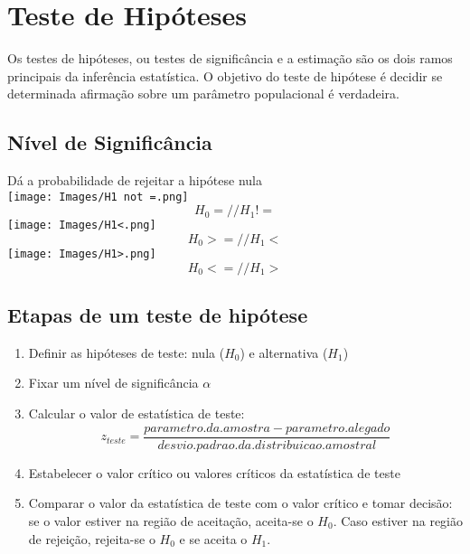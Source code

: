 \documentclass[ ]{article}
\begin{document}
\section{Teste de Hipóteses}
	Os testes de hipóteses, ou testes de significância e a estimação são os dois ramos principais da inferência estatística. O objetivo do teste de hipótese é decidir se determinada afirmação sobre um parâmetro populacional é verdadeira.
\subsection{Nível de Significância}
	 Dá a probabilidade de rejeitar a hipótese nula\\
	 
	 \texttt{[image: Images/H1 not =.png]}
	 $$H_0 = // H_1 !=$$
	  \texttt{[image: Images/H1<.png]}
	  $$H_0>= // H_1 <$$
	   \texttt{[image: Images/H1>.png]}
	   $$H_0<= // H_1 >$$
\subsection{Etapas de um teste de hipótese}
	\begin{enumerate}
		\item Definir as hipóteses de teste: nula ($H_0$) e alternativa ($H_1$)
		\item Fixar um nível de significância $\alpha$
		\item Calcular o valor de estatística de teste:
		$$z_{teste}=\dfrac{parametro.da.amostra - parametro.alegado}{desvio.padrao.da.distribuicao.amostral}$$
		\item Estabelecer o valor crítico ou valores críticos da estatística de teste
		\item Comparar o valor da estatística de teste  com o valor crítico e tomar decisão: se o valor estiver na região de aceitação, aceita-se o $H_0$. Caso estiver na região de rejeição, rejeita-se o $H_0$ e se aceita o $H_1$.
	\end{enumerate}
\end{document}
